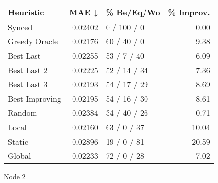 \begin{tabular}{lrlr}
\toprule
\textbf{Heuristic} & \textbf{MAE ↓} & \textbf{\% Be/Eq/Wo} & \textbf{\% Improv.} \\
\midrule
            Synced &        0.02402 &          0 / 100 / 0 &                0.00 \\
     Greedy Oracle &        0.02176 &          60 / 40 / 0 &                9.38 \\
         Best Last &        0.02255 &          53 / 7 / 40 &                6.09 \\
       Best Last 2 &        0.02225 &         52 / 14 / 34 &                7.36 \\
       Best Last 3 &        0.02193 &         54 / 17 / 29 &                8.69 \\
    Best Improving &        0.02195 &         54 / 16 / 30 &                8.61 \\
            Random &        0.02384 &         34 / 40 / 26 &                0.71 \\
             Local &        0.02160 &          63 / 0 / 37 &               10.04 \\
            Static &        0.02896 &          19 / 0 / 81 &              -20.59 \\
            Global &        0.02233 &          72 / 0 / 28 &                7.02 \\
\bottomrule
\end{tabular}
\caption{Node 2}
\label{tab:non_lr01_le1_bs2_2}
